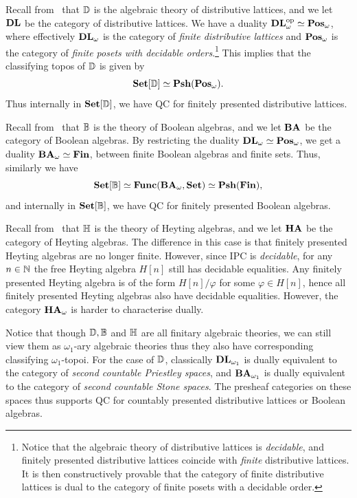 \begin{example}\label{exm:pshdlqc}
  Recall from~ that $\mathbb{D}$ is the algebraic theory of distributive lattices, and we let $\mathbf{DL}$ be the category of distributive lattices. We have a duality $\mathbf{DL}_\omega^{\mathrm{op}} \simeq \mathbf{Pos}_\omega$, where effectively $\mathbf{DL}_\omega$ is the category of \emph{finite distributive lattices} and $\mathbf{Pos}_\omega$ is the category of \emph{finite posets with decidable orders}.\footnote{Notice that the algebraic theory of distributive lattices is \emph{decidable}, and finitely presented distributive lattices coincide with \emph{finite} distributive lattices. It is then constructively provable that the category of finite distributive lattices is dual to the category of finite posets with a decidable order.} This implies that the classifying topos of $\mathbb{D}$ is given by
  \[ \mathbf{Set}[\mathbb{D}] \simeq \mathbf{Psh}(\mathbf{Pos}_\omega). \]
  Thus internally in $\mathbf{Set}[\mathbb{D}]$, we have \gls{QC} for finitely presented distributive lattices.
\end{example}

\begin{example}\label{exm:pshbaqc}
  Recall from~ that $\mathbb{B}$ is the theory of Boolean algebras, and we let $\mathbf{BA}$ be the category of Boolean algebras. By restricting the duality $\mathbf{DL}_\omega \simeq \mathbf{Pos}_\omega$, we get a duality $\mathbf{BA}_\omega \simeq \mathbf{Fin}$, between finite Boolean algebras and finite sets. Thus, similarly we have
  \[ \mathbf{Set}[\mathbb{B}] \simeq \mathbf{Func}(\mathbf{BA}_\omega,\mathbf{Set}) \simeq \mathbf{Psh}(\mathbf{Fin}), \]
  and internally in $\mathbf{Set}[\mathbb{B}]$, we have \gls{QC} for finitely presented Boolean algebras.
\end{example}

\begin{example}\label{exm:pshhaqc}
  Recall from~ that $\mathbb{H}$ is the theory of Heyting algebras, and we let $\mathbf{HA}$ be the category of Heyting algebras. The difference in this case is that finitely presented Heyting algebras are no longer finite. However, since \gls{IPC} is \emph{decidable}, for any $n\in\mathbb{N}$ the free Heyting algebra $H[n]$ still has decidable equalities. Any finitely presented Heyting algebra is of the form $H[n]/\varphi$ for some $\varphi\in H[n]$, hence all finitely presented Heyting algebras also have decidable equalities. However, the category $\mathbf{HA}_\omega$ is harder to characterise dually. 
\end{example}

\begin{example}\label{exm:pshcountablelattice}
  Notice that though $\mathbb{D},\mathbb{B}$ and $\mathbb{H}$ are all finitary algebraic theories, we can still view them as $\omega_1$-ary algebraic theories thus they also have corresponding classifying $\omega_1$-topoi. For the case of $\mathbb{D}$, classically $\mathbf{DL}_{\omega_1}$ is dually equivalent to the category of \emph{second countable Priestley spaces}, and $\mathbf{BA}_{\omega_1}$ is dually equivalent to the category of \emph{second countable Stone spaces}. The presheaf categories on these spaces thus supports \gls{QC} for countably presented distributive lattices or Boolean algebras.
\end{example}

